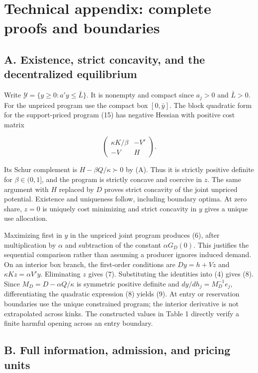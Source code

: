 \documentclass[
  11pt,
]{article}
\begin{document}
\section{Technical appendix: complete proofs and
boundaries}\label{technical-appendix-complete-proofs-and-boundaries}

\subsection{A. Existence, strict concavity, and the decentralized
equilibrium}\label{a.-existence-strict-concavity-and-the-decentralized-equilibrium}

Write \(\mathcal Y=\{y\geq0:a'y\leq\bar L\}\). It is nonempty and
compact since \(a_j>0\) and \(\bar L>0\). For the unpriced program use
the compact box \([0,\bar y]\). The block quadratic form for the
support-priced program (15) has negative Hessian with positive cost
matrix

\[\begin{pmatrix}\kappa K/\beta&-V'\\-V&H\end{pmatrix}. \tag{A1}\]

Its Schur complement is \(H-\beta Q/\kappa\succ0\) by (A). Thus it is
strictly positive definite for \(\beta\in(0,1]\), and the program is
strictly concave and coercive in \(z\). The same argument with \(H\)
replaced by \(D\) proves strict concavity of the joint unpriced
potential. Existence and uniqueness follow, including boundary optima.
At zero share, \(z=0\) is uniquely cost minimizing and strict concavity
in \(y\) gives a unique use allocation.

Maximizing first in \(y\) in the unpriced joint program produces (6),
after multiplication by \(\alpha\) and subtraction of the constant
\(\alpha G_D(0)\). This justifies the sequential comparison rather than
assuming a producer ignores induced demand. On an interior box branch,
the first-order conditions are \(Dy=h+Vz\) and \(\kappa Kz=\alpha V'y\).
Eliminating \(z\) gives (7). Substituting the identities into (4) gives
(8). Since \(M_D=D-\alpha Q/\kappa\) is symmetric positive definite and
\(dy/dh_j=M_D^{-1}e_j\), differentiating the quadratic expression (8)
yields (9). At entry or reservation boundaries use the unique
constrained program; the interior derivative is not extrapolated across
kinks. The constructed values in Table 1 directly verify a finite
harmful opening across an entry boundary.

\subsection{B. Full information, admission, and pricing
units}\label{b.-full-information-admission-and-pricing-units}
\end{document}
